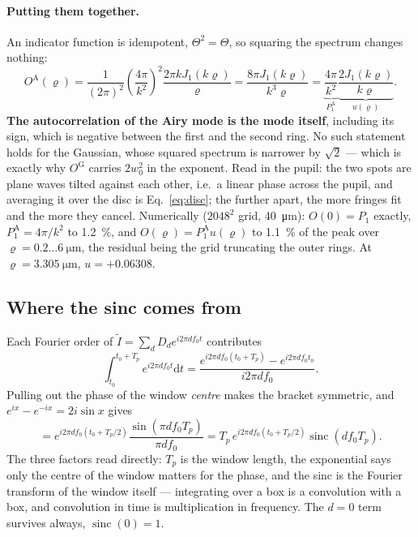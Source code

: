 \documentclass[11pt,a4paper]{article}
\newcommand{\dd}{\mathrm d}
\begin{document}
\paragraph{Putting them together.} An indicator function is idempotent,
$\Theta^2=\Theta$, so squaring the spectrum changes nothing:
\begin{equation}
O^\mathrm{A}(\varrho)
=\frac{1}{(2\pi)^2}\left(\frac{4\pi}{k^2}\right)^{\!2}
\frac{2\pi kJ_1(k\varrho)}{\varrho}
=\frac{8\pi J_1(k\varrho)}{k^3\varrho}
=\underbrace{\frac{4\pi}{k^2}}_{P_1^\mathrm{A}}
\underbrace{\frac{2J_1(k\varrho)}{k\varrho}}_{u(\varrho)} .
\end{equation}
\textbf{The autocorrelation of the Airy mode is the mode itself}, including its
sign, which is negative between the first and the second ring. No such
statement holds for the Gaussian, whose squared spectrum is narrower by
$\sqrt2$ --- which is exactly why $O^\mathrm{G}$ carries $2w_0^2$ in the
exponent. Read in the pupil: the two spots are plane waves tilted against each
other, i.e.\ a linear phase across the pupil, and averaging it over the disc is
Eq.~\eqref{eq:disc}; the further apart, the more fringes fit and the more they
cancel. Numerically ($2048^2$ grid, \SI{40}{\micro\meter}):
$O(0)=P_1$ exactly, $P_1^\mathrm{A}=4\pi/k^2$ to \SI{1.2}{\percent}, and
$O(\varrho)=P_1^\mathrm{A}u(\varrho)$ to \SI{1.1}{\percent} of the peak over
$\varrho=0.2\dots\SI{6}{\micro\meter}$, the residual being the grid truncating
the outer rings. At $\varrho=\SI{3.305}{\micro\meter}$, $u=+0.06308$.

\subsection{Where the sinc comes from}\label{sec:sinc}
Each Fourier order of $\tilde I=\sum_dD_de^{i2\pi df_0t}$ contributes
\begin{equation}
\int_{t_0}^{t_0+T_p}\!e^{i2\pi df_0t}\dd t
=\frac{e^{i2\pi df_0(t_0+T_p)}-e^{i2\pi df_0t_0}}{i2\pi df_0} .
\end{equation}
Pulling out the phase of the window \emph{centre} makes the bracket symmetric,
and $e^{ix}-e^{-ix}=2i\sin x$ gives
\begin{equation}
=e^{i2\pi df_0(t_0+T_p/2)}\frac{\sin(\pi df_0T_p)}{\pi df_0}
=T_p\,e^{i2\pi df_0(t_0+T_p/2)}\operatorname{sinc}(df_0T_p) .
\end{equation}
The three factors read directly: $T_p$ is the window length, the exponential
says only the centre of the window matters for the phase, and the sinc is the
Fourier transform of the window itself --- integrating over a box is a
convolution with a box, and convolution in time is multiplication in frequency.
The $d=0$ term survives always, $\operatorname{sinc}(0)=1$.
\end{document}
